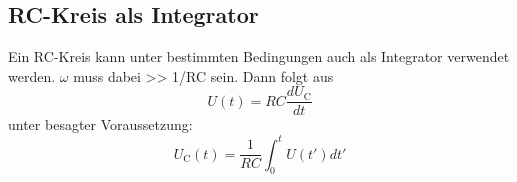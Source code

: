 \subsection{RC-Kreis als Integrator}
Ein RC-Kreis kann unter bestimmten Bedingungen auch als Integrator verwendet werden. $\omega$ muss dabei >> 1/RC sein.
Dann folgt aus
\begin{equation*}
	U(t) = RC \frac{dU_\text{C}}{dt}
\end{equation*}
unter besagter Voraussetzung:
\begin{equation}
	U_\text{C}(t) = \frac{1}{RC} \int_0^t U(t')dt'
\end{equation}